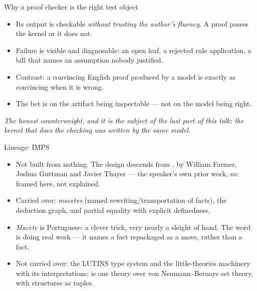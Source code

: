 \documentclass[11pt,aspectratio=169]{beamer}
\begin{document}
\begin{frame}{Why a proof checker is the right test object}
  \begin{itemize}
    \item Its output is checkable \emph{without trusting the author's
          fluency}. A proof passes the kernel or it does not.
    \item Failure is visible and diagnosable: an open leaf, a rejected rule
          application, a bill that names an assumption nobody justified.
    \item Contrast: a convincing English proof produced by a model is exactly
          as convincing when it is wrong.
    \item The bet is on the artifact being inspectable --- not on the model
          being right.
  \end{itemize}
  \vfill
  \small
  \emph{The honest counterweight, and it is the subject of the last part of
  this talk: the kernel that does the checking was written by the same model.}
\end{frame}

\begin{frame}{Lineage: IMPS}
  \begin{itemize}
    \item Not built from nothing. The design descends from \imps{}, by
          William Farmer, Joshua Guttman and Javier Thayer --- the speaker's
          own prior work, so: framed here, not explained.
    \item Carried over: \emph{macetes} (named rewriting/transportation of
          facts), the deduction graph, and partial equality with explicit
          definedness.
    \item \emph{Macete} is Portuguese: a clever trick, very nearly a sleight of
          hand. The word is doing real work --- it names a fact repackaged as a
          move, rather than a fact.
    \item Not carried over: the LUTINS type system and the little-theories
          machinery with its interpretations; \vnb{} is one theory over
          von Neumann--Bernays set theory, with structures as tuples.
  \end{itemize}
\end{frame}
\end{document}
